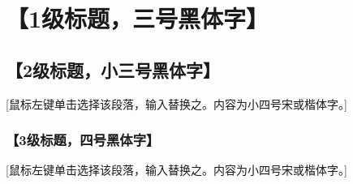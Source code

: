 \chapter{【1级标题，三号黑体字】}
\section{【2级标题，小三号黑体字】 }
 [鼠标左键单击选择该段落，输入替换之。内容为小四号宋或楷体字。]
\subsection{【3级标题，四号黑体字】 }
[鼠标左键单击选择该段落，输入替换之。内容为小四号宋或楷体字。]